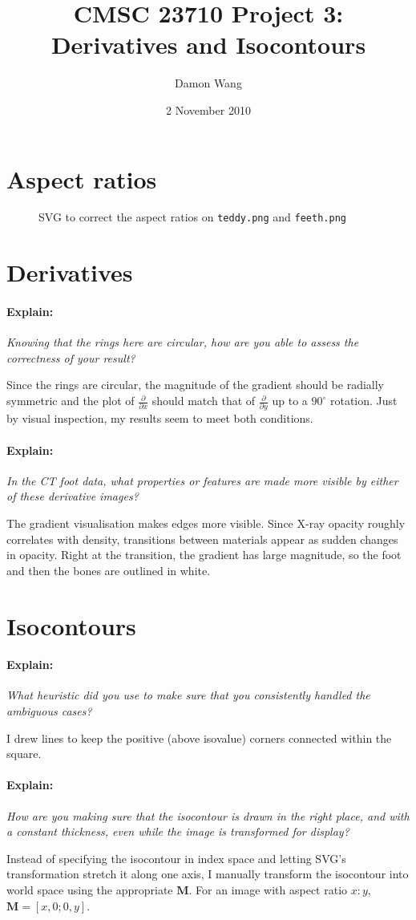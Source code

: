 \documentclass[oldfontcommands]{memoir}
\title{CMSC 23710 Project 3: Derivatives and Isocontours}
\author{Damon Wang}
\date{2 November 2010}
\renewcommand{\vec}[1]{\mathbf{#1}}
\newcommand{\explain}[1]{\paragraph{Explain:} \emph{#1}}
\begin{document}
\tightlists

\maketitle

\section{Aspect ratios}

\begin{figure}
  \small
  
  
  \normalsize\caption{SVG to correct the aspect ratios on \texttt{teddy.png} and \texttt{feeth.png}}
\end{figure}

\section{Derivatives}

\explain{Knowing that the rings here are circular, how are you
able to assess the correctness of your result?}

Since the rings are circular, the magnitude of the gradient should be radially
symmetric and the plot of $\frac{\partial}{\partial x}$ should match that of
$\frac{\partial}{\partial y}$ up to a $90^\circ$ rotation. Just by visual
inspection, my results seem to meet both conditions.

\explain{In the CT foot data, what properties or features are made more visible
by either of these derivative images?}

The gradient visualisation makes edges more visible. Since X-ray opacity roughly
correlates with density, transitions between materials appear as sudden changes
in opacity. Right at the transition, the gradient has large magnitude, so the
foot and then the bones are outlined in white.

\section{Isocontours}

\explain{What heuristic did you use to make sure that you consistently handled
the ambiguous cases?}

I drew lines to keep the positive (above isovalue) corners connected within the
square.

\explain{How are you making sure that the isocontour is drawn in the right
place, and with a constant thickness, even while the image is transformed for
display?}

Instead of specifying the isocontour in index space and letting SVG's
transformation stretch it along one axis, I manually transform the isocontour
into world space using the appropriate $\vec M$. For an image with aspect ratio
$x:y$, $\vec M = [ x, 0 ; 0, y ]$.
\end{document}
